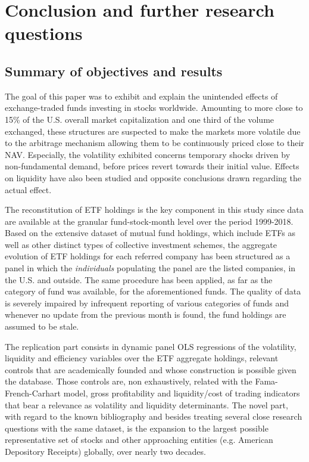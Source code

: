 \section{Conclusion and further research questions}
\label{sec:Conclusion}
\subsection{Summary of objectives and results}
The goal of this paper was to exhibit and explain the unintended effects of exchange-traded funds investing in stocks worldwide. Amounting to more close to 15\% of the U.S. overall market capitalization and one third of the volume exchanged, these structures are suspected to make the markets more volatile due to the arbitrage mechanism allowing them to be continuously priced close to their NAV. Especially, the volatility exhibited concerns temporary shocks driven by non-fundamental demand, before prices revert towards their initial value. Effects on liquidity have also been studied and opposite conclusions drawn regarding the actual effect.

The reconstitution of ETF holdings is the key component in this study since data are available at the granular fund-stock-month level over the period 1999-2018. Based on the extensive dataset of mutual fund holdings, which include ETFs as well as other distinct types of collective investment schemes, the aggregate evolution of ETF holdings for each referred company has been structured as a panel in which the \textit{individuals} populating the panel are the listed companies, in the U.S. and outside. The same procedure has been applied, as far as the category of fund was available, for the aforementioned funds. The quality of data is severely impaired by infrequent reporting of various categories of funds and whenever no update from the previous month is found, the fund holdings are assumed to be stale.

The replication part consists in dynamic panel OLS regressions of the volatility, liquidity and efficiency variables over the ETF aggregate holdings, relevant controls that are academically founded and whose construction is possible given the database. Those controls are, non exhaustively, related with the Fama-French-Carhart model, gross profitability and liquidity/cost of trading indicators that bear a relevance as volatility and liquidity determinants. The novel part, with regard to the known bibliography and besides treating several close research questions with the same dataset, is the expansion to the largest possible representative set of stocks and other approaching entities (e.g. American Depository Receipts) globally, over nearly two decades.


